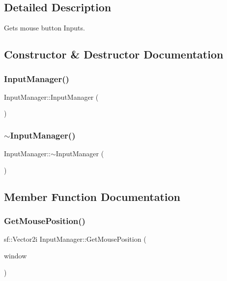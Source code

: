 \subsection{Detailed Description}
Gets mouse button Inputs. 



\subsection{Constructor \& Destructor Documentation}
\mbox{\label{classInputManager_a8be46886da639b26d67181c29dab6d6c}} 
\subsubsection{\texorpdfstring{Input\+Manager()}{InputManager()}}
{\footnotesize\ttfamily Input\+Manager\+::\+Input\+Manager (\begin{DoxyParamCaption}{ }\end{DoxyParamCaption})}

\mbox{\label{classInputManager_af518290877dd183606709d5852db5491}} 
\subsubsection{\texorpdfstring{$\sim$\+Input\+Manager()}{~InputManager()}}
{\footnotesize\ttfamily Input\+Manager\+::$\sim$\+Input\+Manager (\begin{DoxyParamCaption}{ }\end{DoxyParamCaption})}



\subsection{Member Function Documentation}
\mbox{\label{classInputManager_a4c9492c2d988fae3b5f5e21eab7ba72d}} 
\subsubsection{\texorpdfstring{Get\+Mouse\+Position()}{GetMousePosition()}}
{\footnotesize\ttfamily sf\+::\+Vector2i Input\+Manager\+::\+Get\+Mouse\+Position (\begin{DoxyParamCaption}\item[{sf\+::\+Render\+Window \&}]{window }\end{DoxyParamCaption})}



